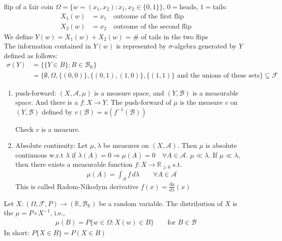 \documentclass[11pt]{article}
\begin{document}
\begin{example}
    flip of a fair coin $\Omega = \{ w = (x_1,x_2): x_1,x_2 \in \{0,1\}\}$, $0 = \text{heads}, \, 1=\text{tails}$:
    \begin{align*}
        X_1(w) &= x_1  \quad \text{outcome of the first flip}\\
        X_2(w) &= x_2  \quad \text{outcome of the second flip}
    \end{align*}
    We define $Y(w) = X_1(w) + X_2(w)$ = \# of tails in the two flips \\
    The information contained in $Y(w)$ is represented by $\sigma$-algebra generated by $Y$ defined as follows:
    \begin{align*}
        \sigma(Y) &= \{\{Y \in B\}: B \in \mathcal{B}_{\mathbb{R}}\}\\
        &= \Big\{\emptyset, \Omega, \{(0,0)\}, \{(0,1),(1,0) \} , \{(1,1)\} \text{ and the unions of these sets}\Big\} \subsetneq \mathcal{F}
    \end{align*}
\end{example}


\begin{enumerate}
    \item push-forward: $(X, \mathcal{A}, \mu)$ is a measure space, 
    and $(Y, \mathcal{B})$ is a measurable space. And there is a $f: X \to Y$.
    The push-forward of $\mu$ is the measure $v$ on $(Y, \mathcal{B})$ defined by $v(\mathcal{B}) =
    u(f^{-1}(\mathcal{B}))$
    \begin{remark}
        Check $v$ is a measure.
    \end{remark}

    \item Absolute continuity: Let $\mu, \lambda$ be measures on $(X, \mathcal{A})$. Then $\mu$ is absolute
    continuous w.r.t $\lambda$ if $\lambda(A) = 0 \Longrightarrow \mu(A) = 0 \quad \forall  A \in \mathcal{A}$.
    \remark $\mu \ll \lambda$. If $\mu \ll \lambda$, then there exists a measurable function 
    $f: X \to \mathbb{R}_{\ge 0}$ s.t. 
    \begin{align*}
        \mu(A) = \int_{A} f \, d \lambda \qquad \forall A \in \mathcal{A}
    \end{align*}
    This is called Radom-Nikodym derivative $f(x) = \frac{d \mu}{d \lambda}(x)$
\end{enumerate}

\begin{definition}
    Let $X: (\Omega, \mathcal{F}, P) \to (\mathbb{R}, \mathcal{B}_{\mathbb{R}})$ be a random variable.
    The $\underline{\text{distribution}}$ of $X$ is the $\mu = P \circ X^{-1}$, i.e.,
    \begin{align*}
        \mu (B) = P\{w \in \Omega: X(w) \in B\} \qquad \text{for } B \in \mathcal{B}
    \end{align*}
    In short: $P\{X \in B\} = P(X \in B)$
\end{definition}
\end{document}
